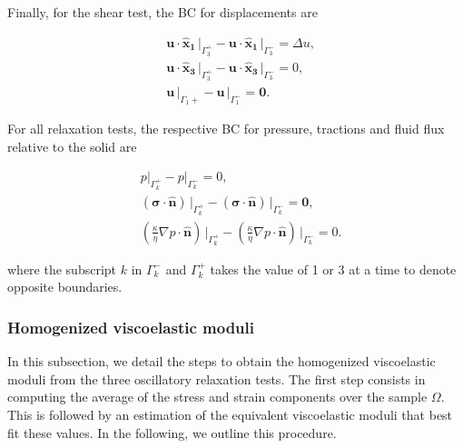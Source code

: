\documentclass[draft]{agujournal2019}
\begin{document}
Finally, for the shear test, the BC for displacements are
\begin{linenomath*}
\begin{equation}\label{Eq.10}
\begin{split}
& \bm{u} \cdot \bm{\hat{x}_1}\,\vert_{\Gamma_3^+}- \bm{u} \cdot \bm{\hat{x}_1} \,\vert_{\Gamma_3^-} =\Delta u,\\
& \bm{u} \cdot \bm{\hat{x}_3}\,\vert_{\Gamma_3^+}- \bm{u} \cdot \bm{\hat{x}_3}\,\vert_{\Gamma_3^-} = 0, \\
& \bm{u}\,\vert_{\Gamma_1+}- \bm{u}\,\vert_{\Gamma_1^-} =\bm{0}.
\end{split}
\end{equation}
\end{linenomath*}

For all relaxation tests, the respective BC for pressure, tractions and fluid flux relative to the solid are
\begin{linenomath*}
\begin{equation}\label{Eq.11}
\begin{split}
& p\vert_{\Gamma_k^+}-p\vert_{\Gamma_k^-} =0, \\
& \left(\bm{\sigma}\cdot \bm{\hat n} \right)\, \vert_{\Gamma_k^+}-\left(\bm{\sigma}\cdot \bm{\hat n} \right)\, \vert_{\Gamma_k^-} = \bm{0},\\
&\left( \frac{\kappa}{\eta} \nabla p \cdot \bm{\hat n} \right) \, \vert_{\Gamma_k^+} -\left( \frac{\kappa}{\eta} \nabla p \cdot \bm{\hat n} \right) \, \vert_{\Gamma_k^-} = 0.
\end{split}
\end{equation}
\end{linenomath*}
where the subscript $k$ in $\Gamma_k^-$ and $\Gamma_k^+$ takes the value of 1 or 3 at a time to denote opposite boundaries.

\subsubsection{Homogenized viscoelastic moduli}
In this subsection, we detail the steps to obtain the homogenized viscoelastic moduli from the three oscillatory relaxation tests. The first step consists in computing the average of the  stress and strain components over the sample $\Omega$. This is followed by an estimation of the equivalent viscoelastic moduli that best fit these values. In the following, we outline this procedure.
\end{document}

